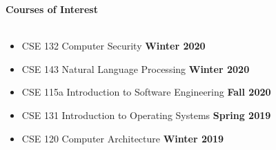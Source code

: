 \documentclass[a4paper]{article}
\newcommand{\lineunder} {
    \vspace*{-8pt} \\
    \hspace*{-18pt} \hrulefill \\
}
\newcommand{\header} [1] {
    {\hspace*{-18pt}\vspace*{6pt}\LARGE \textbf{#1}}
    \vspace*{-6pt} \lineunder
}
\begin{document}
\header{Courses of Interest}
\vspace{1mm}
\begin{itemize}
    \item CSE 132 Computer Security \hfill \textbf{Winter 2020}
    \item CSE 143 Natural Language Processing \hfill \textbf{Winter 2020}
    \item CSE 115a Introduction to Software Engineering \hfill \textbf{Fall 2020}
    \item CSE 131 Introduction to Operating Systems \hfill \textbf{Spring 2019}
    \item CSE 120 Computer Architecture \hfill \textbf{Winter 2019}
\end{itemize}
\end{document}
